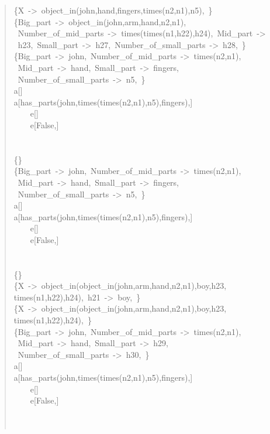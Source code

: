 \begin{quote}
\{X~->~object\_in(john,hand,fingers,times(n2,n1),n5),~\}\\
\{Big\_part~->~object\_in(john,arm,hand,n2,n1),\\ ~Number\_of\_mid\_parts~->~times(times(n1,h22),h24),~Mid\_part~->\\~h23,~Small\_part~->~h27,~Number\_of\_small\_parts~->~h28,~\}\\
\{Big\_part~->~john,~Number\_of\_mid\_parts~->~times(n2,n1),\\~Mid\_part~->~hand,~Small\_part~->~fingers,\\~Number\_of\_small\_parts~->~n5,~\}\\
a[]\\
a[has\_parts(john,times(times(n2,n1),n5),fingers),]\\
~~~~e[]\\
~~~~e[False,]\\
~\\
~\\
\{\}\\
\{Big\_part~->~john,~Number\_of\_mid\_parts~->~times(n2,n1),\\ ~Mid\_part~->~hand,~Small\_part~->~fingers,\\~Number\_of\_small\_parts~->~n5,~\}\\
a[]\\
a[has\_parts(john,times(times(n2,n1),n5),fingers),]\\
~~~~e[]\\
~~~~e[False,]\\
~\\
~\\
\{\}\\
\{X~->~object\_in(object\_in(john,arm,hand,n2,n1),boy,h23,\\ times(n1,h22),h24),~h21~->~boy,~\}\\
\{X~->~object\_in(object\_in(john,arm,hand,n2,n1),boy,h23,\\ times(n1,h22),h24),~\}\\
\{Big\_part~->~john,~Number\_of\_mid\_parts~->~times(n2,n1),\\ ~Mid\_part~->~hand,~Small\_part~->~h29,\\~Number\_of\_small\_parts~->~h30,~\}\\
a[]\\
a[has\_parts(john,times(times(n2,n1),n5),fingers),]\\
~~~~e[]\\
~~~~e[False,]\\
~\\
~\\

\end{quote}
